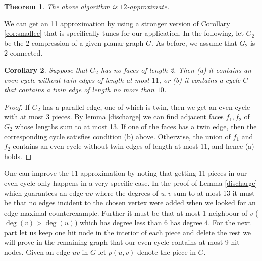 \documentclass{article}
\newcommand{\0}{\mathbb{0}}
\newcommand{\1}{\mathbb{1}}
\newtheorem{theorem}{Theorem}[section]
\newtheorem{corollary}[theorem]{Corollary}
\begin{document}
\begin{theorem}
  The above algorithm is $12$-approximate. 
\end{theorem}

We can get an 11 approximation by using a stronger version of Corollary \ref{cor:smallec}
that is specifically tunes for our application. In the following, let $G_2$ be the
2-compression of a given planar graph $G$. As before, we assume that $G_2$ is 2-connected.

\begin{corollary}
Suppose that $G_2$ has no faces of length 2. Then (a) it contains an even cycle without
twin edges of length at most $11$, or (b) it contains a cycle $C$ that contains a twin
edge of
length no more than $10$. 
\end{corollary}
\begin{proof} 
If $G_2$ has a parallel edge, one of which is twin, then we get an even cycle with at most 3 pieces.
By lemma \ref{discharge} we can find adjacent faces $f_1,f_2$ of $G_2$ whose lengths sum
to at most 13. If one of the faces has a twin edge, then the corresponding cycle satisfies
condition (b) above. Otherwise, the union of $f_1$ and $f_2$ contains an even cycle
without twin edges of length at most $11$, and hence (a) holds. 
\end{proof}

One can improve the 11-approximation by noting that getting 11 pieces in our
even cycle only happens in a very specific case. In the proof of Lemma
\ref{discharge} which guarantees an edge $uv$ where the degrees of $u,v$ sum
to at most 13 it must be that no edges incident to the chosen vertex were
added when we looked for an edge maximal counterexample. Further it must be
that at most 1 neighbour of $v$ ($\deg(v)>\deg(u)$) which has degree less than 6
has degree 4.  For the next part let us keep one hit node in the interior of
each piece and delete the rest we will prove in the remaining graph that our
even cycle contains at most 9 hit nodes. Given an edge $uv$ in $G$ let
$p(u,v)$ denote the piece in $G$. 
\end{document}
